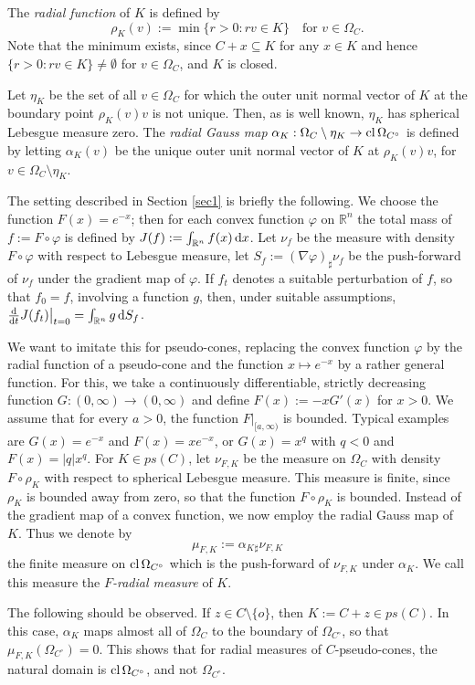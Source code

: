\documentclass[12pt]{article}
\newcommand{\0}{\mbox{\boldmath$o$}}
\newcommand{\R}{{\mathbb R}}
\newcommand{\D}{{\rm d}}
\begin{document}
The {\em radial function} of $K$ is defined by
$$ \rho_K(v):= \min\{r>0: rv\in K\}\quad\mbox{for }v\in\Omega_C.$$
Note that the minimum exists, since $C+x\subseteq K$ for any $x\in K$ and hence $\{r>0: rv \in K\}\not=\emptyset$ for $v\in\Omega_C$, and $K$ is closed. 

Let $\eta_K$ be the set of all $v\in\Omega_C$ for which the outer unit normal vector of $K$ at the boundary point $\rho_K(v)v$ is not unique. Then, as is well known, $\eta_K$ has spherical Lebesgue measure zero. The {\em radial Gauss map} $\alpha_K: \Omega_C\setminus\eta_K\to {\rm cl}\,\Omega_{C^\circ}$ is defined by letting $\alpha_K(v)$ be the unique outer unit normal vector of $K$ at $\rho_K(v)v$, for $v\in \Omega_C\setminus\eta_K$. 

The setting described in Section \ref{sec1} is briefly the following. We choose the function $F(x)=e^{-x}$; then for each convex function $\varphi$ on $\R^n$ the total mass of $f:= F\circ\varphi$ is defined by $J(f):= \int_{\R^n} f(x)\,\D x$. Let $\nu_f$ be the measure with density $F\circ \varphi$ with respect to Lebesgue measure, let $S_f:= (\nabla\varphi)_\sharp \nu_f$ be the push-forward of $\nu_f$ under the gradient map of $\varphi$. If $f_t$ denotes a suitable perturbation of $f$, so that $f_0=f$, involving a function $g$, then, under suitable assumptions, $\frac{\D}{\D t}J(f_t)\big|_{t=0} = \int_{\R^n}g\,\D S_f$.

We want to imitate this for pseudo-cones, replacing the convex function $\varphi$ by the radial function of a pseudo-cone and the function $x\mapsto e^{-x}$ by a rather general function. For this, we take a continuously differentiable, strictly decreasing function $G:(0,\infty)\to (0,\infty)$ and define $F(x) := -xG'(x)$ for $x>0$. We 
assume that for every $a>0$, the function $F|_{[a,\infty)}$ is bounded. Typical examples are $G(x)=e^{-x}$ and $F(x)=xe^{-x}$, or $G(x)= x^q$ with $q<0$ and $F(x)=|q| x^q$. For $K\in ps(C)$, let $\nu_{F,K}$ be the measure on $\Omega_C$ with density $F\circ\rho_K$ with respect to spherical Lebesgue measure. This measure is finite, since $\rho_K$ is bounded away from zero, so that the function $F\circ\rho_K$ is bounded. Instead of the gradient map of a convex function, we now employ the radial Gauss map of $K$. Thus we denote by 
$$\mu_{F,K}:= \alpha_K{_\sharp} \nu_{F,K}$$
the finite measure on ${\rm cl}\,\Omega_{C^\circ}$ which is the push-forward of $\nu_{F,K}$ under $\alpha_K$. We call this measure the {\em $F$-radial measure} of $K$. 

The following should be observed. If $z\in C\setminus\{o\}$, then $K:= C+z\in ps(C)$. In this case, $\alpha_K$ maps almost all of $\Omega_C$ to the boundary of $\Omega_{C^\circ}$, so that $\mu_{F,K}(\Omega_{C^\circ})=0$. This shows that for radial measures of $C$-pseudo-cones, the natural domain is ${\rm cl}\,\Omega_{C^\circ}$, and not $\Omega_{C^\circ}$.
\end{document}

